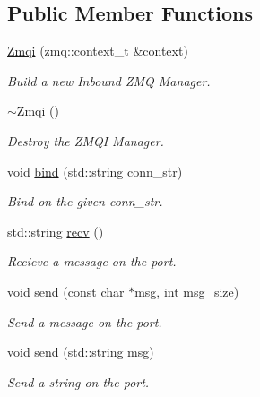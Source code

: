 \subsection*{Public Member Functions}
\begin{DoxyCompactItemize}
\item 
\hypertarget{classZmqi_aa83e723dca3ad4734a5482019a156a4e}{\hyperlink{classZmqi_aa83e723dca3ad4734a5482019a156a4e}{Zmqi} (zmq\-::context\-\_\-t \&context)}\label{classZmqi_aa83e723dca3ad4734a5482019a156a4e}

\begin{DoxyCompactList}\small\item\em Build a new Inbound Z\-M\-Q Manager. \end{DoxyCompactList}\item 
\hypertarget{classZmqi_aa90b541fb0bc12f79d65e04f4a58b9fb}{\hyperlink{classZmqi_aa90b541fb0bc12f79d65e04f4a58b9fb}{$\sim$\-Zmqi} ()}\label{classZmqi_aa90b541fb0bc12f79d65e04f4a58b9fb}

\begin{DoxyCompactList}\small\item\em Destroy the Z\-M\-Q\-I Manager. \end{DoxyCompactList}\item 
\hypertarget{classZmqi_ad54a77411f2149c346298512966b13cb}{void \hyperlink{classZmqi_ad54a77411f2149c346298512966b13cb}{bind} (std\-::string conn\-\_\-str)}\label{classZmqi_ad54a77411f2149c346298512966b13cb}

\begin{DoxyCompactList}\small\item\em Bind on the given conn\-\_\-str. \end{DoxyCompactList}\item 
\hypertarget{classZmqi_acdc3a5addbd2236f0dc25d120edf05af}{std\-::string \hyperlink{classZmqi_acdc3a5addbd2236f0dc25d120edf05af}{recv} ()}\label{classZmqi_acdc3a5addbd2236f0dc25d120edf05af}

\begin{DoxyCompactList}\small\item\em Recieve a message on the port. \end{DoxyCompactList}\item 
\hypertarget{classZmqi_a6543637f6b8dd0c01ef0aa773a40fdce}{void \hyperlink{classZmqi_a6543637f6b8dd0c01ef0aa773a40fdce}{send} (const char $\ast$msg, int msg\-\_\-size)}\label{classZmqi_a6543637f6b8dd0c01ef0aa773a40fdce}

\begin{DoxyCompactList}\small\item\em Send a message on the port. \end{DoxyCompactList}\item 
\hypertarget{classZmqi_a3bf1017f5893fb138c0c776e6b8e050f}{void \hyperlink{classZmqi_a3bf1017f5893fb138c0c776e6b8e050f}{send} (std\-::string msg)}\label{classZmqi_a3bf1017f5893fb138c0c776e6b8e050f}

\begin{DoxyCompactList}\small\item\em Send a string on the port. \end{DoxyCompactList}\end{DoxyCompactItemize}


